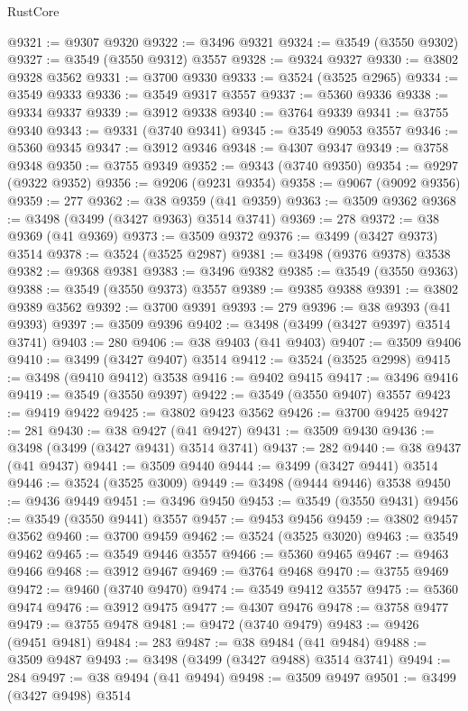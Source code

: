 \begin{lexlean}{RustCore}
\begin{coremodule}
@9321 := @9307 @9320
@9322 := @3496 @9321
@9324 := @3549 (@3550 @9302)
@9327 := @3549 (@3550 @9312) @3557
@9328 := @9324 @9327
@9330 := @3802 @9328 @3562
@9331 := @3700 @9330
@9333 := @3524 (@3525 @2965)
@9334 := @3549 @9333
@9336 := @3549 @9317 @3557
@9337 := @5360 @9336
@9338 := @9334 @9337
@9339 := @3912 @9338
@9340 := @3764 @9339
@9341 := @3755 @9340
@9343 := @9331 (@3740 @9341)
@9345 := @3549 @9053 @3557
@9346 := @5360 @9345
@9347 := @3912 @9346
@9348 := @4307 @9347
@9349 := @3758 @9348
@9350 := @3755 @9349
@9352 := @9343 (@3740 @9350)
@9354 := @9297 (@9322 @9352)
@9356 := @9206 (@9231 @9354)
@9358 := @9067 (@9092 @9356)
@9359 := 277
@9362 := @38 @9359 (@41 @9359)
@9363 := @3509 @9362
@9368 := @3498 (@3499 (@3427 @9363) @3514 @3741)
@9369 := 278
@9372 := @38 @9369 (@41 @9369)
@9373 := @3509 @9372
@9376 := @3499 (@3427 @9373) @3514
@9378 := @3524 (@3525 @2987)
@9381 := @3498 (@9376 @9378) @3538
@9382 := @9368 @9381
@9383 := @3496 @9382
@9385 := @3549 (@3550 @9363)
@9388 := @3549 (@3550 @9373) @3557
@9389 := @9385 @9388
@9391 := @3802 @9389 @3562
@9392 := @3700 @9391
@9393 := 279
@9396 := @38 @9393 (@41 @9393)
@9397 := @3509 @9396
@9402 := @3498 (@3499 (@3427 @9397) @3514 @3741)
@9403 := 280
@9406 := @38 @9403 (@41 @9403)
@9407 := @3509 @9406
@9410 := @3499 (@3427 @9407) @3514
@9412 := @3524 (@3525 @2998)
@9415 := @3498 (@9410 @9412) @3538
@9416 := @9402 @9415
@9417 := @3496 @9416
@9419 := @3549 (@3550 @9397)
@9422 := @3549 (@3550 @9407) @3557
@9423 := @9419 @9422
@9425 := @3802 @9423 @3562
@9426 := @3700 @9425
@9427 := 281
@9430 := @38 @9427 (@41 @9427)
@9431 := @3509 @9430
@9436 := @3498 (@3499 (@3427 @9431) @3514 @3741)
@9437 := 282
@9440 := @38 @9437 (@41 @9437)
@9441 := @3509 @9440
@9444 := @3499 (@3427 @9441) @3514
@9446 := @3524 (@3525 @3009)
@9449 := @3498 (@9444 @9446) @3538
@9450 := @9436 @9449
@9451 := @3496 @9450
@9453 := @3549 (@3550 @9431)
@9456 := @3549 (@3550 @9441) @3557
@9457 := @9453 @9456
@9459 := @3802 @9457 @3562
@9460 := @3700 @9459
@9462 := @3524 (@3525 @3020)
@9463 := @3549 @9462
@9465 := @3549 @9446 @3557
@9466 := @5360 @9465
@9467 := @9463 @9466
@9468 := @3912 @9467
@9469 := @3764 @9468
@9470 := @3755 @9469
@9472 := @9460 (@3740 @9470)
@9474 := @3549 @9412 @3557
@9475 := @5360 @9474
@9476 := @3912 @9475
@9477 := @4307 @9476
@9478 := @3758 @9477
@9479 := @3755 @9478
@9481 := @9472 (@3740 @9479)
@9483 := @9426 (@9451 @9481)
@9484 := 283
@9487 := @38 @9484 (@41 @9484)
@9488 := @3509 @9487
@9493 := @3498 (@3499 (@3427 @9488) @3514 @3741)
@9494 := 284
@9497 := @38 @9494 (@41 @9494)
@9498 := @3509 @9497
@9501 := @3499 (@3427 @9498) @3514

\end{coremodule}
\end{lexlean}

